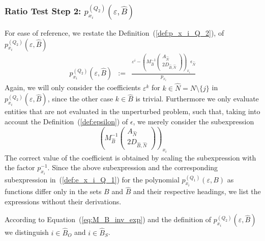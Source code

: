 \documentclass[a4paper]{article}
\newcommand{\px}[3]{\ensuremath{p_{x_{#1}}^{(#2)}(\varepsilon, #3)}}
\begin{document}
\subsubsection{Ratio Test Step 2: \px{i}{Q_{2}}{\hat{B}}}
For ease of reference, we restate the Definition~(\ref{def:p_x_i_Q_2}),
of $p_{x_{i}}^{(Q_{2})}(\varepsilon, \hat{B})$
\begin{eqnarray*}
\px{i}{Q_{2}}{\hat{B}} &:=&
  \frac{\varepsilon^{i} -
         \left(M_{\hat{B}}^{-1}
           \left(\begin{array}{c}
                    A_{\hat{N}}  \\
	            \hline
	            2D_{\hat{B}, \hat{N}}
	         \end{array}
	   \right)
         \right)_{x_{i}}\epsilon_{\hat{N}}}{p_{x_{i}}}
\end{eqnarray*}
Again, we will only consider the coefficients
$\varepsilon^{k}$ for $k \in \hat{N}= N \setminus \{j\}$ in
\px{i}{Q_{2}}{\hat{B}}, since the other case $k \in \hat{B}$
is trivial. Furthermore we only evaluate entities that are not evaluated in the
unperturbed problem, such that, taking into account the
Definition~(\ref{def:epsilon}) of $\epsilon$, 
we merely consider the subexpression
\begin{equation*}
\left(
  M_{\hat{B}}^{-1}
  \left(\begin{array}{c}
          A_{\hat{N}}  \\
          \hline
          2D_{\hat{B}, \hat{N}}
        \end{array}
  \right)
\right)_{x_{i}}
\end{equation*}
The correct value of the coefficient is obtained by scaling the subexpression
with the factor $p_{x_{i}}^{-1}$.
Since the above subexpression and the corresponding subexpression
in~(\ref{def:e_x_i_Q_1}) for the polynomial \px{i}{Q_{1}}{B} as
functions differ only in the sets $B$ and $\hat{B}$ and their respective
headings, we list the expressions without their derivations.

According to Equation~(\ref{eq:M_B_inv_exp}) and the definition of
\px{i}{Q_{2}}{\hat{B}} we distinguish $i \in \hat{B}_{O}$ and
$i \in \hat{B}_{S}$.
  
\end{document}
